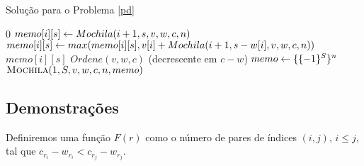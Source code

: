 \begin{algorithm}[H]
\caption{Solução para o Problema \ref{pd}}
\label{pd:code}
\begin{algorithmic}[1]
    \State \Return $0$
  \EndIf
    \State $memo[i][s] \leftarrow Mochila(i + 1, s, v, w, c, n)$
      \State $memo[i][s] \leftarrow max(memo[i][s], v[i] + Mochila(i + 1, s - w[i], v, w, c, n))$
    \EndIf
  \EndIf
  \State \Return $memo[i][s]$
\EndFunction
{}
    \State $Ordene(v, w, c)$ (decrescente em $c - w$) 
    \State $memo \leftarrow \{\{-1\}^S\}^n$
    \State \Return $\textsc{Mochila}(1, S, v, w, c, n, memo)$
\EndFunction
\end{algorithmic}
\end{algorithm}

\subsection{Demonstrações}

Definiremos uma função $F(r)$ como o número de pares de índices $(i, j)$, $i \leq j$, tal que $c_{r_i} - w_{r_i} < c_{r_j} - w_{r_j}$.


